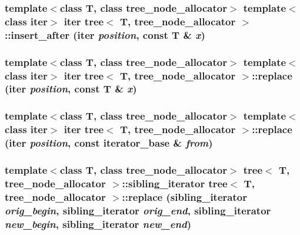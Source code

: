 \hypertarget{classtree_215ab56bd13f59c661eb2298e373ff3e}{
\subsubsection{\setlength{\rightskip}{0pt plus 5cm}template$<$class T, class tree\_\-node\_\-allocator$>$ template$<$class iter$>$ iter {\bf tree}$<$ T, tree\_\-node\_\-allocator $>$::insert\_\-after (iter {\em position}, \/  const T \& {\em x})}}
\label{classtree_215ab56bd13f59c661eb2298e373ff3e}


\hypertarget{classtree_4885e968c82655ebebea5d0927b7e9f4}{
\subsubsection{\setlength{\rightskip}{0pt plus 5cm}template$<$class T, class tree\_\-node\_\-allocator$>$ template$<$class iter$>$ iter {\bf tree}$<$ T, tree\_\-node\_\-allocator $>$::replace (iter {\em position}, \/  const T \& {\em x})}}
\label{classtree_4885e968c82655ebebea5d0927b7e9f4}


\hypertarget{classtree_5d2ad4532598f26c84b1ab0ec84a5d62}{
\subsubsection{\setlength{\rightskip}{0pt plus 5cm}template$<$class T, class tree\_\-node\_\-allocator$>$ template$<$class iter$>$ iter {\bf tree}$<$ T, tree\_\-node\_\-allocator $>$::replace (iter {\em position}, \/  const {\bf iterator\_\-base} \& {\em from})}}
\label{classtree_5d2ad4532598f26c84b1ab0ec84a5d62}


\hypertarget{classtree_fc5bef13996f2fd939d83837aa8e090d}{
\subsubsection{\setlength{\rightskip}{0pt plus 5cm}template$<$class T, class tree\_\-node\_\-allocator$>$ {\bf tree}$<$ T, tree\_\-node\_\-allocator $>$::{\bf sibling\_\-iterator} {\bf tree}$<$ T, tree\_\-node\_\-allocator $>$::replace ({\bf sibling\_\-iterator} {\em orig\_\-begin}, \/  {\bf sibling\_\-iterator} {\em orig\_\-end}, \/  {\bf sibling\_\-iterator} {\em new\_\-begin}, \/  {\bf sibling\_\-iterator} {\em new\_\-end})}}
\label{classtree_fc5bef13996f2fd939d83837aa8e090d}


